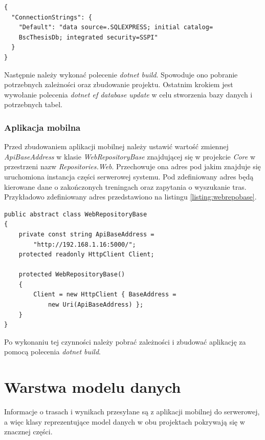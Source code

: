 \begin{lstlisting}[caption={Plik konfiguracyjny aplikacji serwerowej},label=listing:appsettings]
{
  "ConnectionStrings": {
    "Default": "data source=.SQLEXPRESS; initial catalog=
    BscThesisDb; integrated security=SSPI"
  }
}
\end{lstlisting}

Następnie należy wykonać polecenie \textit{dotnet build}. Spowoduje ono pobranie potrzebnych zależności oraz zbudowanie projektu. Ostatnim krokiem jest wywołanie polecenia \textit{dotnet ef database update} w celu stworzenia bazy danych i potrzebnych tabel.

\subsubsection{Aplikacja mobilna}
Przed zbudowaniem aplikacji mobilnej należy ustawić wartość zmiennej \textit{ApiBaseAddress} w klasie \textit{WebRepositoryBase} znajdującej się w projekcie \textit{Core} w przestrzeni nazw \textit{Repositories.Web}. Przechowuje ona adres pod jakim znajduje się uruchomiona instancja części serwerowej systemu. Pod zdefiniowany adres będą kierowane dane o zakończonych treningach oraz zapytania o wyszukanie tras. Przykładowo zdefiniowany adres przedstawiono na listingu \ref{listing:webrepobase}.

\begin{lstlisting}[caption={Klasa zawierająca adres aplikacji serwerowej},label=listing:webrepobase]
public abstract class WebRepositoryBase
{
	private const string ApiBaseAddress = 
		"http://192.168.1.16:5000/";
	protected readonly HttpClient Client;

	protected WebRepositoryBase()
	{
		Client = new HttpClient { BaseAddress =
			new Uri(ApiBaseAddress) };
	}
}
\end{lstlisting}

Po wykonaniu tej czynności należy pobrać zależności i zbudować aplikację za pomocą polecenia \textit{dotnet build}.


\section{Warstwa modelu danych}
Informacje o trasach i wynikach przesyłane są z aplikacji mobilnej do serwerowej, a więc klasy reprezentujące model danych w obu projektach pokrywają się w znacznej części.
